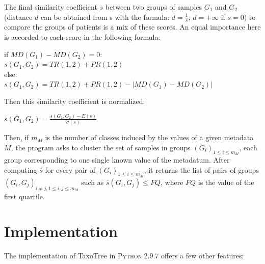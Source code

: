 \documentclass{report}
\begin{document}
The final similarity coefficient $s$ between two groups of samples $G_{1}$ and $G_{2}$ (distance $d$ can be obtained from s with the formula: $d = \frac{1}{s}$, $d = +\infty$ if $s = 0$) to compare the groups of patients is a mix of these scores. An equal importance here is accorded to each score in the following formula:\\

\begin{center}
if $MD(G_{1}) - MD(G_{2}) = 0$:\\
$s(G_{1},G_{2}) = TR(1,2) + PR(1,2)$\\

else:\\
$s(G_{1},G_{2}) = TR(1,2) + PR(1,2) - | MD(G_{1}) - MD(G_{2}) |$\\
\end{center}

Then this similarity coefficient is normalized:\\
\begin{center}
$\overline{s}(G_{1},G_{2}) = \frac{s(G_{1},G_{2}) - E(s)}{\sigma(s)}$\\
\end{center}

Then, if $m_{M}$ is the number of classes induced by the values of a given metadata $M$, the program asks to cluster the set of samples in groups $(G_{i})_{1 \le i \le m_{M}}$, each group corresponding to one single known value of the metadatum. After computing $\overline{s}$ for every pair of $(G_{i})_{1 \le i \le m_{M}}$, it returns the list of pairs of groups $(G_{i},G_{j})_{i \neq j, 1 \le i,j \le m_{M}}$ such as $\overline{s}(G_{i},G_{j}) \le FQ$, where $FQ$ is the value of the first quartile. 

\section{Implementation}

The implementation of TaxoTree in \textsc{Python 2.9.7} offers a few other features:
\end{document}
